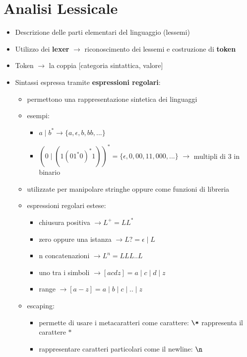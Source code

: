 \documentclass[12pt]{extarticle}
\begin{document}
\newpage

\section*{Analisi Lessicale}

\begin{itemize}
  \item Descrizione delle parti elementari del linguaggio (lessemi)
  \item Utilizzo dei \textbf{lexer} $\rightarrow$ riconoscimento dei lessemi e costruzione di \textbf{token}
  \item Token $\rightarrow$ la coppia [categoria sintattica, valore]
  \item Sintassi espressa tramite \textbf{espressioni regolari}:
  \begin{itemize}
    \item permettono una rappresentazione sintetica dei linguaggi
    \item esempi: 
    \begin{itemize}
      \item $a \mid b^* \rightarrow \{a, \epsilon, b, bb, ... \}$ 
      \item $(0 \mid (1(01^*0)^*1))^* = \{ \epsilon, 0, 00, 11, 000, ...\}$ $\rightarrow$ multipli di 3 in binario
    \end{itemize}
    \item utilizzate per manipolare stringhe oppure come funzioni di libreria
    \item espressioni regolari estese:
    \begin{itemize}
      \item chiusura positiva $\rightarrow  L^+ = LL^*$
      \item zero oppure una istanza $\rightarrow  L? = \epsilon \mid L$
      \item n concatenazioni $\rightarrow L^n = LLL..L$
      \item uno tra i simboli $\rightarrow [acdz] = a \mid c \mid d \mid z$
      \item range $\rightarrow [a-z] =  a \mid b \mid c \mid .. \mid z$
    \end{itemize}
    \item escaping:
    \begin{itemize}
      \item permette di usare i metacaratteri come carattere: $ \verb|\*|$ rappresenta il carattere $\ast$
      \item rappresentare caratteri particolari come il newline: $\verb|\n|$

\end{itemize}
\end{itemize}
\end{itemize}
\end{document}
